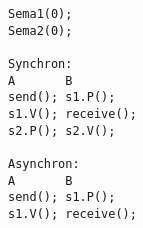 \begin{answer}
\begin{verbatim}
Sema1(0);
Sema2(0);

Synchron:
A       B
send(); s1.P();
s1.V(); receive();
s2.P(); s2.V();

Asynchron:
A       B
send(); s1.P();
s1.V(); receive();
\end{verbatim}
\end{answer}
